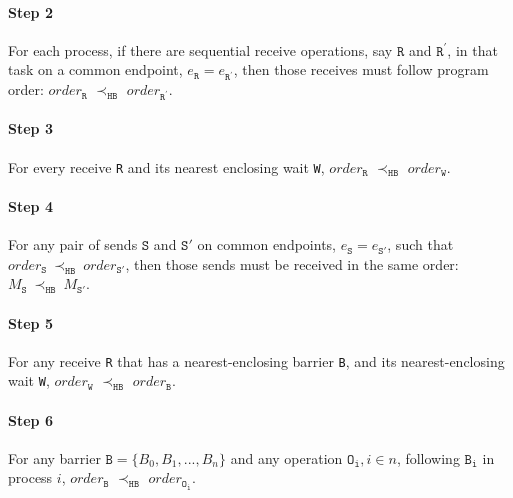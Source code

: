 \paragraph*{Step 2} For each process, if there are sequential receive
operations, say $\mathtt{R}$ and $\mathtt{R^\prime}$, in that task
on a common endpoint, $e_\mathtt{R} = e_\mathtt{R^\prime}$, then those
receives must follow program order: $\mathit{order}_\mathtt{R}$
$\prec_\mathtt{HB}$ $\mathit{order}_\mathtt{R^\prime}$.

\paragraph*{Step 3} For every receive \texttt{R} and its nearest
enclosing wait \texttt{W}, $\mathit{order}_\mathtt{R}$
$\prec_\mathtt{HB}$ $\mathit{order}_\mathtt{W}$.

\paragraph*{Step 4} For any pair of sends $\mathtt{S}$ and
$\mathtt{S'}$ on common endpoints, $e_{\mathtt{S}}=e_{\mathtt{S'}}$,
such that
$\mathit{order}_\mathtt{S}\ \mathrm{\prec_\mathtt{HB}}\ \mathit{order}_\mathtt{S'}$,
then those sends must be received in the same order:
$M_{\mathtt{S}}\ \mathrm{\prec_{\mathtt{HB}}}\ M_{\mathtt{S'}}$.

\paragraph*{Step 5} For any receive \texttt{R} that has a nearest-enclosing barrier \texttt{B}, and its nearest-enclosing wait \texttt{W}, $\mathit{order}_\mathtt{W}$
$\prec_\mathtt{HB}$ $\mathit{order}_\mathtt{B}$.

\paragraph*{Step 6} For any barrier $\mathtt{B} = \{B_0, B_1, ..., B_n\}$ and any operation $\mathtt{O_i}, i\in n$, following $\mathtt{B_i}$ in process $i$, $\mathit{order}_\mathtt{B}$
$\prec_\mathtt{HB}$ $\mathit{order}_\mathtt{O_i}$.






